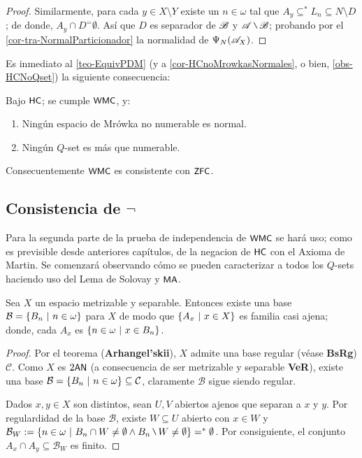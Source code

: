 \begin{proof}
        Similarmente, para cada $y \in X \setminus Y$ existe un $n \in \omega$ tal que $A_y \subseteq^* L_n \subseteq N \setminus D$; de donde, $A_y \cap D ^= \emptyset$. Así que $D$ es separador de $\mathscr{B}$ y $\ms{A} \setminus \ms{B}$; probando por el \autoref{cor-tra-NormalParticionador} la normalidad de $\Psi_N(\mathscr{A}_X)$.
    \end{proof}
    
    Es inmediato al \autoref{teo-EquivPDM} (y a \ref{cor-HCnoMrowkasNormales}, o bien, \ref{obs-HCNoQset}) la siguiente consecuencia:

    \begin{corolario}\label{cor-PdmConsistente}
        Bajo $\text{\textsf{\small HC}}$; se cumple $\text{\textsf{\small WMC}}$, y:
        \begin{enumerate}
            \item Ningún espacio de Mrówka no numerable es normal.
            \item Ningún $Q$-set es más que numerable.
        \end{enumerate}
        Consecuentemente $\text{\textsf{\small WMC}}$ es consistente con $\text{\textsf{\small ZFC}}$.
    \end{corolario}
    
    \subsection{Consistencia de \texorpdfstring{$\lnot$}\textsf{WMC}}
    
    Para la segunda parte de la prueba de independencia de $\text{\textsf{\small WMC}}$ se hará uso; como es previsible desde anteriores capítulos, de la negacion de $\text{\textsf{\small HC}}$ con el Axioma de Martin. Se comenzará observando cómo se pueden caracterizar a todos los $Q$-sets haciendo uso del Lema de Solovay y $\text{\textsf{\small MA}}$.

    \begin{lema}
        Sea $X$ un espacio metrizable y separable. Entonces existe una base $\mathcal{B}=\{B_n \text{ $|$ } n \in \omega\}$ para $X$ de modo que $\{A_x \text{ $|$ } x \in X\}$ es familia casi ajena; donde, cada $A_x$ es $\{n \in \omega \text{ $|$ } x \in B_n\}$.
    \end{lema}
    \begin{proof}
        Por el teorema (\textbf{Arhangel’skii}), $X$ admite una base regular (véase \textbf{BsRg}) $\mathcal{C}$. Como $X$ es $2\text{\textsf{\small AN}}$ (a consecuencia de ser metrizable y separable \textbf{VeR}), existe una base $\mathcal{B}=\{B_n \text{ $|$ } n \in \omega\} \subseteq \mathcal{C}$, claramente $\mathcal{B}$ sigue siendo regular.
        
        Dados $x,y \in X$ son distintos, sean $U,V$ abiertos ajenos que separan a $x$ y $y$. Por regulardidad de la base $\mathcal{B}$, existe $W \subseteq U$ abierto con $x\in W$ y
        $\mathcal{B}_W:=\{n \in \omega \tq B_n \cap W \neq \emptyset \land B_n \setminus W \neq \emptyset\} =^* \emptyset$. Por consiguiente, el conjunto $A_x \cap A_y \subseteq \mathcal{B}_W$ es finito.
    \end{proof}


